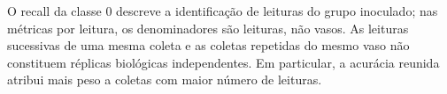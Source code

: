 O recall da classe 0 descreve a identificação de leituras do grupo
inoculado; nas métricas por leitura, os denominadores são leituras, não
vasos. As leituras sucessivas de uma mesma coleta e as coletas repetidas do mesmo
vaso não constituem réplicas biológicas independentes. Em particular,
a acurácia reunida atribui mais peso a coletas com maior número de leituras.


